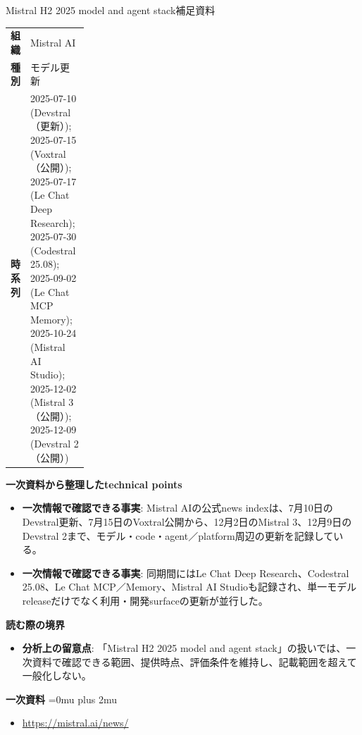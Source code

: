 \begin{technicalnote}{Mistral H2 2025 model and agent stack}{補足資料}
\begingroup
\begin{tabularx}{\linewidth}{@{}>{\bfseries}p{0.22\linewidth}X@{}}
組織 & Mistral AI \\
種別 & モデル更新 \\
時系列 & 2025-07-10 (Devstral（更新）); 2025-07-15 (Voxtral（公開）); 2025-07-17 (Le Chat Deep Research); 2025-07-30 (Codestral 25.08); 2025-09-02 (Le Chat MCP Memory); 2025-10-24 (Mistral AI Studio); 2025-12-02 (Mistral 3（公開）); 2025-12-09 (Devstral 2（公開）) \\
\end{tabularx}
\smallskip
{\bfseries 一次資料から整理したtechnical points}
\begin{itemize}[leftmargin=1.5em,itemsep=0.35em]
\item \textbf{一次情報で確認できる事実}: Mistral AIの公式news indexは、7月10日のDevstral更新、7月15日のVoxtral公開から、12月2日のMistral 3、12月9日のDevstral 2まで、モデル・code・agent／platform周辺の更新を記録している。
\item \textbf{一次情報で確認できる事実}: 同期間にはLe Chat Deep Research、Codestral 25.08、Le Chat MCP／Memory、Mistral AI Studioも記録され、単一モデルreleaseだけでなく利用・開発surfaceの更新が並行した。
\end{itemize}
\begin{minipage}{\linewidth}
{\bfseries 読む際の境界}
\begin{itemize}[leftmargin=1.5em,itemsep=0.35em]
\item \textbf{分析上の留意点}: 「Mistral H2 2025 model and agent stack」の扱いでは、一次資料で確認できる範囲、提供時点、評価条件を維持し、記載範囲を超えて一般化しない。
\end{itemize}
\begin{samepage}
{\bfseries 一次資料}
\begingroup\sloppy
\Urlmuskip=0mu plus 2mu\relax
\begin{itemize}[leftmargin=1.5em,itemsep=0.25em]
\item {\scriptsize\url{https://mistral.ai/news/}}
\end{itemize}
\endgroup
\end{samepage}
\end{minipage}
\endgroup
\end{technicalnote}
\medskip

